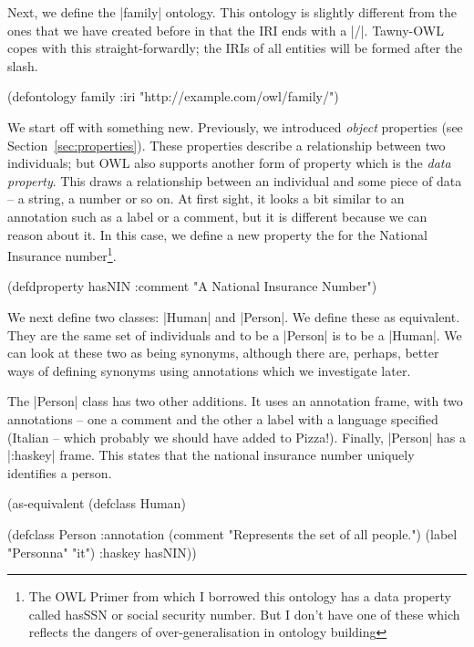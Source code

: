 Next, we define the |family| ontology. This ontology is slightly
different from the ones that we have created before in that the IRI
ends with a |/|. Tawny-OWL copes with this straight-forwardly; the
IRIs of all entities will be formed after the slash.

\begin{tawny}
(defontology family
  :iri "http://example.com/owl/family/")
\end{tawny}

We start off with something new. Previously, we introduced
\emph{object} properties (see Section~\ref{sec:properties}). These
properties describe a relationship between two individuals; but OWL
also supports another form of property which is the \emph{data
  property}. This draws a relationship between an individual and some
piece of data -- a string, a number or so on. At first sight, it looks
a bit similar to an annotation such as a label or a comment, but it is
different because we can reason about it. In this case, we define a
new property the for the National Insurance number\footnote{The OWL
  Primer from which I borrowed this ontology has a data property
  called hasSSN or social security number. But I don't have one of
  these which reflects the dangers of over-generalisation in ontology
  building}.

\begin{tawny}
(defdproperty hasNIN
  :comment "A National Insurance Number")
\end{tawny}

We next define two classes: |Human| and |Person|. We define these as
equivalent. They are the same set of individuals and to be a |Person|
is to be a |Human|. We can look at these two as being synonyms,
although there are, perhaps, better ways of defining synonyms using
annotations which we investigate later.

The |Person| class has two other additions. It uses an annotation
frame, with two annotations -- one a comment and the other a label
with a language specified (Italian -- which probably we should have
added to Pizza!). Finally, |Person| has a |:haskey| frame. This states
that the national insurance number uniquely identifies a person.

\begin{tawny}
(as-equivalent
 (defclass Human)

 (defclass Person
   :annotation (comment "Represents the set of all people.")
   (label "Personna" "it")
   :haskey hasNIN))
\end{tawny}



